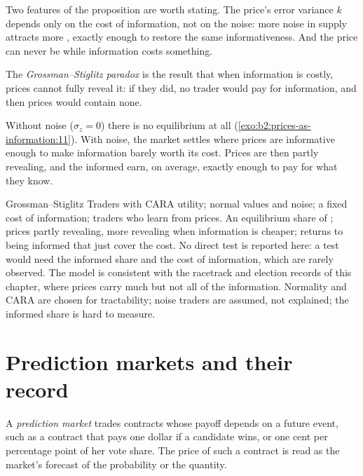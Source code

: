 Two features of the proposition are worth stating. The price's error variance $k$ depends only on the cost
of information, not on the noise: more noise in supply attracts more , exactly enough to
restore the same informativeness. And the price can never be  while information costs
something.

\begin{definition}\label{def:b2:prices-as-information:gs-paradox}
The \emph{Grossman--Stiglitz paradox} is the result that when
information is costly, prices cannot fully reveal it: if they did, no trader would pay for information,
and then prices would contain none.
\end{definition}

Without noise ($\sigma_z = 0$) there is no equilibrium at all (\cref{exo:b2:prices-as-information:11}). With
noise, the market settles where prices are informative enough to make information barely worth its cost.
Prices are then partly revealing, and the informed earn, on average, exactly enough to pay for what they
know.

\begin{model}{Grossman--Stiglitz}
\assumes Traders with CARA utility; normal values and noise; a fixed cost of information; traders who
learn from prices.
\predicts An equilibrium share of ; prices partly revealing, more revealing when
information is cheaper; returns to being informed that just cover the cost.
\tested No direct test is reported here: a test would need the informed share and the cost of information,
which are rarely observed. The model is consistent with the racetrack and election records of this chapter,
where prices carry much but not all of the information.
\breaks Normality and CARA are chosen for tractability; noise traders are assumed, not explained; the
informed share is hard to measure.
\end{model}

\section{Prediction markets and their record}\label{sec:b2:prices-as-information:prediction}

\begin{definition}\label{def:b2:prices-as-information:prediction-market}
A \emph{prediction market} trades contracts whose payoff depends on a future
event, such as a contract that pays one dollar if a candidate wins, or one cent per percentage point of
her vote share. The price of such a contract is read as the market's forecast of the probability or the
quantity.
\end{definition}

